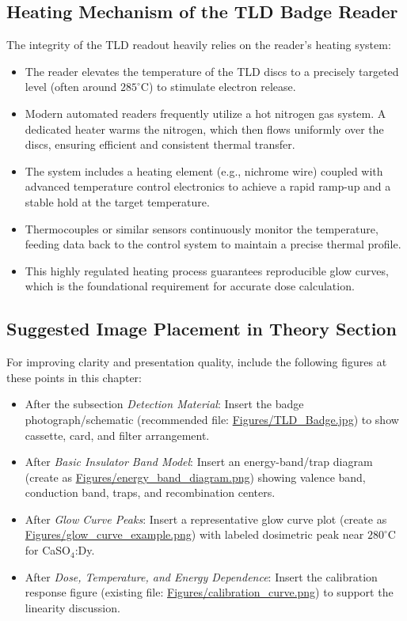 \subsection{Heating Mechanism of the TLD Badge Reader}
The integrity of the TLD readout heavily relies on the reader's heating system:
\begin{itemize}
    \item The reader elevates the temperature of the TLD discs to a precisely targeted level (often around $285^\circ$C) to stimulate electron release.
    \item Modern automated readers frequently utilize a hot nitrogen gas system. A dedicated heater warms the nitrogen, which then flows uniformly over the discs, ensuring efficient and consistent thermal transfer.
    \item The system includes a heating element (e.g., nichrome wire) coupled with advanced temperature control electronics to achieve a rapid ramp-up and a stable hold at the target temperature.
    \item Thermocouples or similar sensors continuously monitor the temperature, feeding data back to the control system to maintain a precise thermal profile.
    \item This highly regulated heating process guarantees reproducible glow curves, which is the foundational requirement for accurate dose calculation.
\end{itemize}

\subsection{Suggested Image Placement in Theory Section}
For improving clarity and presentation quality, include the following figures at these points in this chapter:
\begin{itemize}
    \item After the subsection \textit{Detection Material}: Insert the badge photograph/schematic (recommended file: \url{Figures/TLD_Badge.jpg}) to show cassette, card, and filter arrangement.
    \item After \textit{Basic Insulator Band Model}: Insert an energy-band/trap diagram (create as \url{Figures/energy_band_diagram.png}) showing valence band, conduction band, traps, and recombination centers.
    \item After \textit{Glow Curve Peaks}: Insert a representative glow curve plot (create as \url{Figures/glow_curve_example.png}) with labeled dosimetric peak near $280^\circ$C for CaSO$_4$:Dy.
    \item After \textit{Dose, Temperature, and Energy Dependence}: Insert the calibration response figure (existing file: \url{Figures/calibration_curve.png}) to support the linearity discussion.
\end{itemize}
